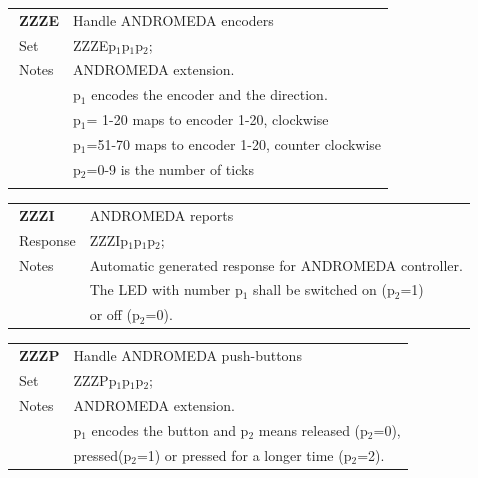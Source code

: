 \documentclass[12pt]{book}
\begin{document}
\begin{center}
\begin{tabular}{|p{2cm}|p{11cm}|}
\toprule
$\phantom{\Big|}$\textbf{\large ZZZE} & Handle ANDROMEDA encoders \\\cline{1-2}
$\phantom{\Big|}${\large Set} & {ZZZEp$_1$p$_1$p$_2$;} \\\hline
$\phantom{\Big|}${\large Notes} & \multicolumn{1}{|p{11cm}|}{ANDROMEDA extension.} \\
 & \multicolumn{1}{|p{11cm}|}{p$_1$ encodes the encoder and the direction.} \\
 & \multicolumn{1}{|p{11cm}|}{p$_1$= 1-20 maps to encoder 1-20, clockwise} \\
 & \multicolumn{1}{|p{11cm}|}{p$_1$=51-70 maps to encoder 1-20, counter clockwise} \\
 & \multicolumn{1}{|p{11cm}|}{p$_2$=0-9 is the number of ticks} \\
 & \multicolumn{1}{|p{11cm}|}{} \\
\bottomrule
\end{tabular}
\end{center}

\begin{center}
\begin{tabular}{|p{2cm}|p{11cm}|}
\toprule
$\phantom{\Big|}$\textbf{\large ZZZI} & ANDROMEDA reports \\\cline{1-2}
$\phantom{\Big|}${\large Response} & {ZZZIp$_1$p$_1$p$_2$;} \\\hline
$\phantom{\Big|}${\large Notes} & \multicolumn{1}{|p{11cm}|}{Automatic generated response for ANDROMEDA controller.} \\
 & \multicolumn{1}{|p{11cm}|}{The LED with number p$_1$ shall be switched on (p$_2$=1)} \\
 & \multicolumn{1}{|p{11cm}|}{or off (p$_2$=0).} \\
\bottomrule
\end{tabular}
\end{center}

\begin{center}
\begin{tabular}{|p{2cm}|p{11cm}|}
\toprule
$\phantom{\Big|}$\textbf{\large ZZZP} & Handle ANDROMEDA push-buttons \\\cline{1-2}
$\phantom{\Big|}${\large Set} & {ZZZPp$_1$p$_1$p$_2$;} \\\hline
$\phantom{\Big|}${\large Notes} & \multicolumn{1}{|p{11cm}|}{ANDROMEDA extension.} \\
 & \multicolumn{1}{|p{11cm}|}{p$_1$ encodes the button and p$_2$ means released (p$_2$=0),} \\
 & \multicolumn{1}{|p{11cm}|}{pressed(p$_2$=1) or pressed for a longer time (p$_2$=2).} \\
\bottomrule
\end{tabular}
\end{center}
\end{document}
